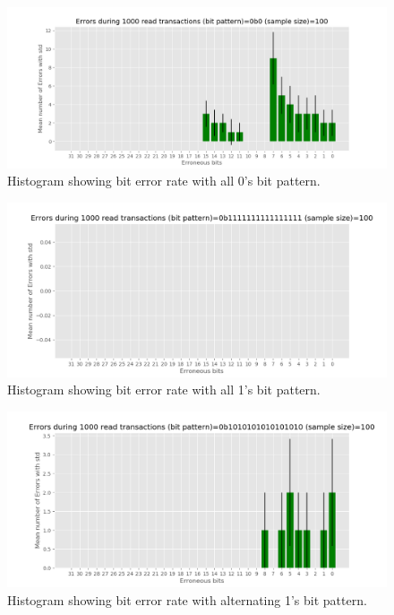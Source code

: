 \documentclass[main.tex]{subfiles}
\begin{document}
\begin{figure}[!ht]
    \centering
    \includegraphics[width=18cm]{images/error_rate_all_0s.png}
    \caption{Histogram showing bit error rate with all 0's bit pattern.}
    \label{fig: all_0_bit_rate}
\end{figure}
\FloatBarrier

\begin{figure}[!ht]
    \centering
    \includegraphics[width=18cm]{images/error_rate_all_1s.png}
    \caption{Histogram showing bit error rate with all 1's bit pattern.}
    \label{fig: all_1_bit_rate}
\end{figure}
\FloatBarrier

\begin{figure}[!ht]
    \centering
    \includegraphics[width=18cm]{images/error_rate_alternating_1s.png}
    \caption{Histogram showing bit error rate with alternating 1's bit pattern.}
    \label{fig: alternating_1_bit_rate}
\end{figure}
\FloatBarrier
\end{document}
